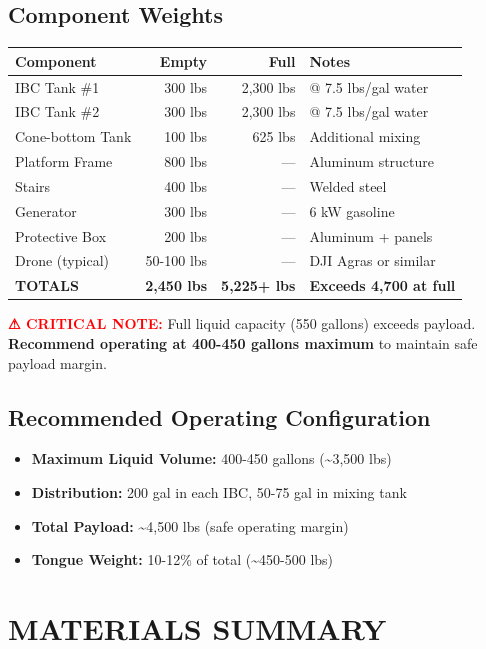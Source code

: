 \documentclass[11pt,letter]{article}
\begin{document}
\subsection{Component Weights}
\begin{tabular}{lrrp{3cm}}
\toprule
\textbf{Component} & \textbf{Empty} & \textbf{Full} & \textbf{Notes} \\
\midrule
IBC Tank \#1 & 300 lbs & 2,300 lbs & @ 7.5 lbs/gal water \\
IBC Tank \#2 & 300 lbs & 2,300 lbs & @ 7.5 lbs/gal water \\
Cone-bottom Tank & 100 lbs & 625 lbs & Additional mixing \\
Platform Frame & 800 lbs & --- & Aluminum structure \\
Stairs & 400 lbs & --- & Welded steel \\
Generator & 300 lbs & --- & 6 kW gasoline \\
Protective Box & 200 lbs & --- & Aluminum + panels \\
Drone (typical) & 50-100 lbs & --- & DJI Agras or similar \\
\textbf{TOTALS} & \textbf{2,450 lbs} & \textbf{5,225+ lbs} & \textbf{Exceeds 4,700 at full} \\
\bottomrule
\end{tabular}

\textbf{\textcolor{red}{⚠ CRITICAL NOTE:}} Full liquid capacity (550 gallons) exceeds payload. \textbf{Recommend operating at 400-450 gallons maximum} to maintain safe payload margin.

\subsection{Recommended Operating Configuration}
\begin{itemize}
  \item \textbf{Maximum Liquid Volume:} 400-450 gallons (\textasciitilde{}3,500 lbs)
  \item \textbf{Distribution:} 200 gal in each IBC, 50-75 gal in mixing tank
  \item \textbf{Total Payload:} \textasciitilde{}4,500 lbs (safe operating margin)
  \item \textbf{Tongue Weight:} 10-12\% of total (\textasciitilde{}450-500 lbs)
\end{itemize}

\section{MATERIALS SUMMARY}
\end{document}
